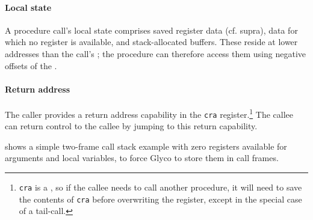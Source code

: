 \documentclass[main.tex]{subfiles}
\begin{document}
\paragraph{Local state} A procedure call's local state comprises saved register data (cf. supra), data for which no register is available, and stack-allocated buffers. These reside at lower addresses than the call's ; the procedure can therefore access them using negative offsets of the .

\paragraph{Return address} The caller provides a return address capability in the \texttt{cra} register.\footnote{\texttt{cra} is a , so if the callee needs to call another procedure, it will need to save the contents of \texttt{cra} before overwriting the register, except in the special case of a tail-call.} The callee can return control to the callee by jumping to this return capability.

 shows a simple two-frame call stack example with zero registers available for arguments and local variables, to force Glyco to store them in call frames.
\end{document}
